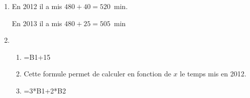 \begin{enumerate}
\item %
En 2012 il a mis $480 + 40 = 520$~min.

En 2013 il a mis $480 + 25 = 505$~min 
\item %

%
 
	\begin{enumerate}
		\item %
		=B1+15
		\item %

Cette formule permet de calculer en fonction de $x$ le temps mis en 2012. 
		\item %
=3*B1+2*B2
	\end{enumerate}



\end{enumerate}
